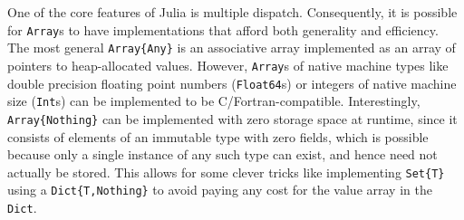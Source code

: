 \documentclass[preprint]{sigplanconf}
\newcommand{\code}[1]{\texttt{#1}}
\begin{document}
One of the core features of Julia is multiple dispatch. Consequently, it is
possible for \code{Array}s to have implementations that afford both generality
and efficiency. The most general \code{Array\{Any\}} is an associative array
implemented as an array of pointers to heap-allocated values. However,
\code{Array}s of native machine types like double precision floating point
numbers (\code{Float64}s) or integers of native machine size (\code{Int}s) can
be implemented to be C/Fortran-compatible. Interestingly,
\code{Array\{Nothing\}} can be implemented with zero storage space at runtime,
since it consists of elements of an immutable type with zero fields, which is
possible because only a single instance of any such type can exist, and hence
need not actually be stored. This allows for some clever tricks like
implementing \code{Set\{T\}} using a \code{Dict\{T,Nothing\}} to avoid paying
any cost for the value array in the \code{Dict}.



\end{document}
